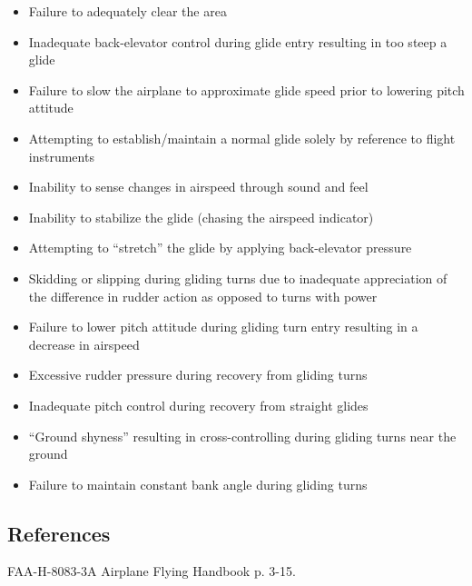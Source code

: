 \begin{itemize}
  \item Failure to adequately clear the area
  \item Inadequate back-elevator control during glide entry resulting in too
    steep a glide
  \item Failure to slow the airplane to approximate glide speed prior to
    lowering pitch attitude
  \item Attempting to establish/maintain a normal glide solely by reference to
    flight instruments
  \item Inability to sense changes in airspeed through sound and feel
  \item Inability to stabilize the glide (chasing the airspeed indicator)
  \item Attempting to ``stretch'' the glide by applying back-elevator pressure
  \item Skidding or slipping during gliding turns due to inadequate
    appreciation of the difference in rudder action as opposed to turns with
    power
  \item Failure to lower pitch attitude during gliding turn entry resulting in
    a decrease in airspeed
  \item Excessive rudder pressure during recovery from gliding turns
  \item Inadequate pitch control during recovery from straight glides
  \item ``Ground shyness'' resulting in cross-controlling during gliding turns
    near the ground
  \item Failure to maintain constant bank angle during gliding turns
\end{itemize}

\subsection{References}

FAA-H-8083-3A Airplane Flying Handbook p. 3-15.

